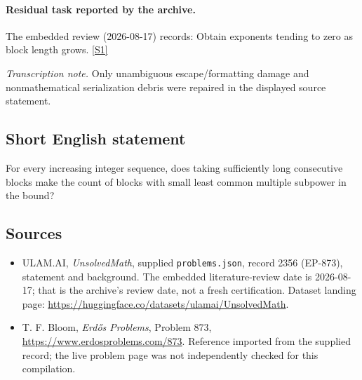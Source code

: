 \documentclass[11pt,a4paper]{article}
\newcommand{\sref}[2]{\hyperlink{source:#1:#2}{[S#2]}}
\begin{document}
\paragraph{Residual task reported by the archive.}

The embedded review (2026-08-17) records: Obtain exponents tending to zero as block length grows. \sref{2356}{1}

{\small\emph{Transcription note.} Only unambiguous escape/formatting damage and nonmathematical serialization debris were repaired in the displayed source statement.}

\subsection{Short English statement}

For every increasing integer sequence, does taking sufficiently long consecutive blocks make the count of blocks with small least common multiple subpower in the bound?

\subsection{Sources}

{\small

\begin{itemize}

\item[\hypertarget{source:2356:1}{S1}] ULAM.AI, \emph{UnsolvedMath}, supplied \texttt{problems.json}, record 2356 (EP-873), statement and background. The embedded literature-review date is 2026-08-17; that is the archive’s review date, not a fresh certification. Dataset landing page: \url{https://huggingface.co/datasets/ulamai/UnsolvedMath}.

\item[\hypertarget{source:2356:2}{S2}] T. F. Bloom, \emph{Erdős Problems}, Problem 873, \url{https://www.erdosproblems.com/873}. Reference imported from the supplied record; the live problem page was not independently checked for this compilation.

\end{itemize}

}

\label{end:2356}
\end{document}
